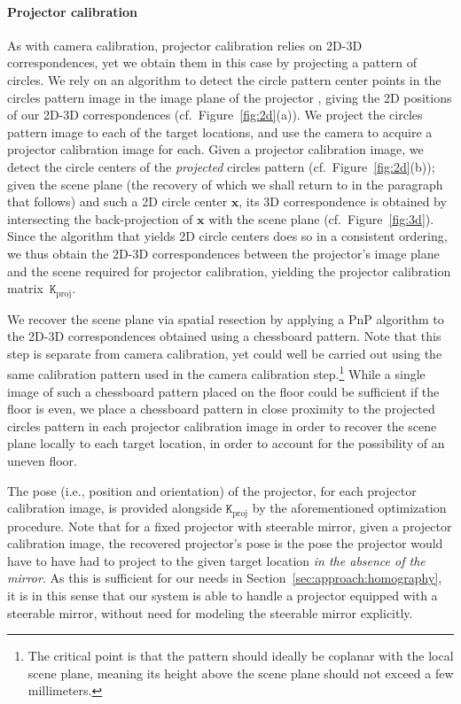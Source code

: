 \documentclass[review]{elsarticle}
\begin{document}
\paragraph{Projector calibration} As with camera calibration, projector calibration relies on 2D-3D correspondences, yet we obtain them in this case by projecting a pattern of circles. We rely on an algorithm to detect the circle pattern center points in the circles pattern image in the image plane of the projector \cite{bradski2000opencv}, giving the 2D positions of our 2D-3D correspondences (cf.\ Figure~\ref{fig:2d}(a)). We project the circles pattern image to each of the target locations, and use the camera to acquire a projector calibration image for each. Given a projector calibration image, we detect the circle centers of the \textit{projected} circles pattern (cf.\ Figure~\ref{fig:2d}(b)); given the scene plane (the recovery of which we shall return to in the paragraph that follows) and such a 2D circle center $\mathbf{x}$, its 3D correspondence is obtained by intersecting the back-projection of $\mathbf{x}$ with the scene plane (cf.\ Figure~\ref{fig:3d}). Since the algorithm that yields 2D circle centers does so in a consistent ordering, we thus obtain the 2D-3D correspondences between the projector's image plane and the scene required for projector calibration, yielding the projector calibration matrix~$\mathtt{K}_\text{proj}$.

We recover the scene plane via spatial resection by applying a PnP algorithm \cite{terzakis2020consistently} to the 2D-3D correspondences obtained using a chessboard pattern. Note that this step is separate from camera calibration, yet could well be carried out using the same calibration pattern used in the camera calibration step.\footnote{The critical point is that the pattern should ideally be coplanar with the local scene plane, meaning its height above the scene plane should not exceed a few millimeters.} While a single image of such a chessboard pattern placed on the floor could be sufficient if the floor is even, we place a chessboard pattern in close proximity to the projected circles pattern in each projector calibration image in order to recover the scene plane locally to each target location, in order to account for the possibility of an uneven floor.

The pose (i.e., position and orientation) of the projector, for each projector calibration image, is provided alongside $\mathtt{K}_\text{proj}$ by the aforementioned optimization procedure. Note that for a fixed projector with steerable mirror, given a projector calibration image, the recovered projector's pose is the pose the projector would have to have had to project to the given target location \textit{in the absence of the mirror}. As this is sufficient for our needs in Section~\ref{sec:approach:homography}, it is in this sense that our system is able to handle a projector equipped with a steerable mirror, without need for modeling the steerable mirror explicitly.
\end{document}
